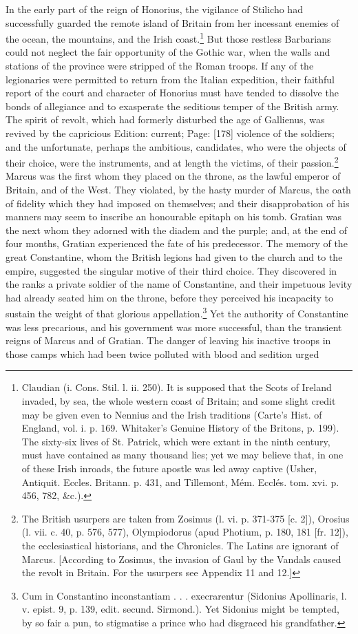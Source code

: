 In the early part of the reign of Honorius, the vigilance of Stilicho had successfully guarded the remote island of Britain from her incessant enemies of the ocean, the mountains, and the Irish coast.\footnote{Claudian (i. Cons. Stil. l. ii. 250). It is supposed that the Scots of Ireland invaded, by sea, the whole western coast of Britain; and some slight credit may be given even to Nennius and the Irish traditions (Carte\texthebrew{}’s Hist. of England, vol. i. p. 169. Whitaker\texthebrew{}’s Genuine History of the Britons, p. 199). The sixty-six lives of St. Patrick, which were extant in the ninth century, must have contained as many thousand lies; yet we may believe that, in one of these Irish inroads, the future apostle was led away captive (Usher, Antiquit. Eccles. Britann. p. 431, and Tillemont, Mém. Ecclés. tom. xvi. p. 456, 782, \&c.).} But those restless Barbarians could not neglect the fair opportunity of the Gothic war, when the walls and stations of the province were stripped of the Roman troops. If any of the legionaries were permitted to return from the Italian expedition, their faithful report of the court and character of Honorius must have tended to dissolve the bonds of allegiance and to exasperate the seditious temper of the British army. The spirit of revolt, which had formerly disturbed the age of Gallienus, was revived by the capricious Edition: current; Page: [178] violence of the soldiers; and the unfortunate, perhaps the ambitious, candidates, who were the objects of their choice, were the instruments, and at length the victims, of their passion.\footnote{The British usurpers are taken from Zosimus (l. vi. p. 371-375 [c. 2]), Orosius (l. vii. c. 40, p. 576, 577), Olympiodorus (apud Photium, p. 180, 181 [fr. 12]), the ecclesiastical historians, and the Chronicles. The Latins are ignorant of Marcus. [According to Zosimus, the invasion of Gaul by the Vandals caused the revolt in Britain. For the usurpers see Appendix 11 and 12.]} Marcus was the first whom they placed on the throne, as the lawful emperor of Britain, and of the West. They violated, by the hasty murder of Marcus, the oath of fidelity which they had imposed on themselves; and their disapprobation of his manners may seem to inscribe an honourable epitaph on his tomb. Gratian was the next whom they adorned with the diadem and the purple; and, at the end of four months, Gratian experienced the fate of his predecessor. The memory of the great Constantine, whom the British legions had given to the church and to the empire, suggested the singular motive of their third choice. They discovered in the ranks a private soldier of the name of Constantine, and their impetuous levity had already seated him on the throne, before they perceived his incapacity to sustain the weight of that glorious appellation.\footnote{Cum in Constantino inconstantiam . . . execrarentur (Sidonius Apollinaris, l. v. epist. 9, p. 139, edit. secund. Sirmond.). Yet Sidonius might be tempted, by so fair a pun, to stigmatise a prince who had disgraced his grandfather.} Yet the authority of Constantine was less precarious, and his government was more successful, than the transient reigns of Marcus and of Gratian. The danger of leaving his inactive troops in those camps which had been twice polluted with blood and sedition urged 